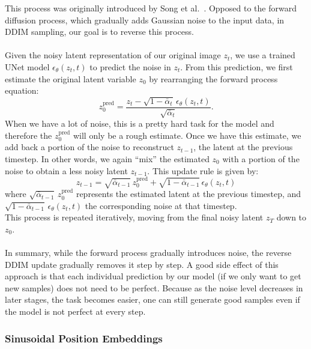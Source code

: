 This process was originally introduced by Song et al.~\cite{song2021denoising}. 
Opposed to the forward diffusion process, which gradually adds Gaussian noise to the input data, in DDIM sampling, our goal is to reverse this process. 
\\\\
Given the noisy latent representation of our original image \( z_t \), 
we use a trained UNet model \(\epsilon_\theta(z_t,t)\) to predict the noise in \( z_t \). 
From this prediction, we first estimate the original latent variable \( z_0 \) by rearranging the forward process equation:
\begin{equation}
    z_0^{\text{pred}} = \frac{z_t - \sqrt{1-\bar{\alpha}_t}\,\epsilon_\theta(z_t,t)}{\sqrt{\bar{\alpha}_t}}.
\end{equation}
When we have a lot of noise, this is a pretty hard task for the model and therefore the \( z_0^{\text{pred}} \) will only be a rough estimate.
Once we have this estimate, we add back a portion of the noise to reconstruct \( z_{t-1} \), the latent at the previous timestep.
In other words, we again “mix” the estimated \( z_0 \) with a portion of the noise to obtain a less noisy latent \( z_{t-1} \).
This update rule is given by:
\begin{equation}
    z_{t-1} = \sqrt{\bar{\alpha}_{t-1}}\,z_0^{\text{pred}} + \sqrt{1-\bar{\alpha}_{t-1}}\,\epsilon_\theta(z_t,t)
\end{equation}
where \(\sqrt{\bar{\alpha}_{t-1}}\,z_0^{\text{pred}}\) represents the estimated latent at the previous timestep, and \(\sqrt{1-\bar{\alpha}_{t-1}}\,\epsilon_\theta(z_t,t)\) the corresponding noise at that timestep.  
\\[1ex]
This process is repeated iteratively, moving from the final noisy latent \( z_T \) down to \( z_0 \).
\\\\
In summary, while the forward process gradually introduces noise, the reverse DDIM update gradually removes it step by step. 
A good side effect of this approach is that each individual prediction by our model (if we only want to get new samples) does not need to be perfect.
Because as the noise level decreases in later stages, the task becomes easier, one can still generate good samples even if the model is not perfect at every step.


\subsubsection{Sinusoidal Position Embeddings}

